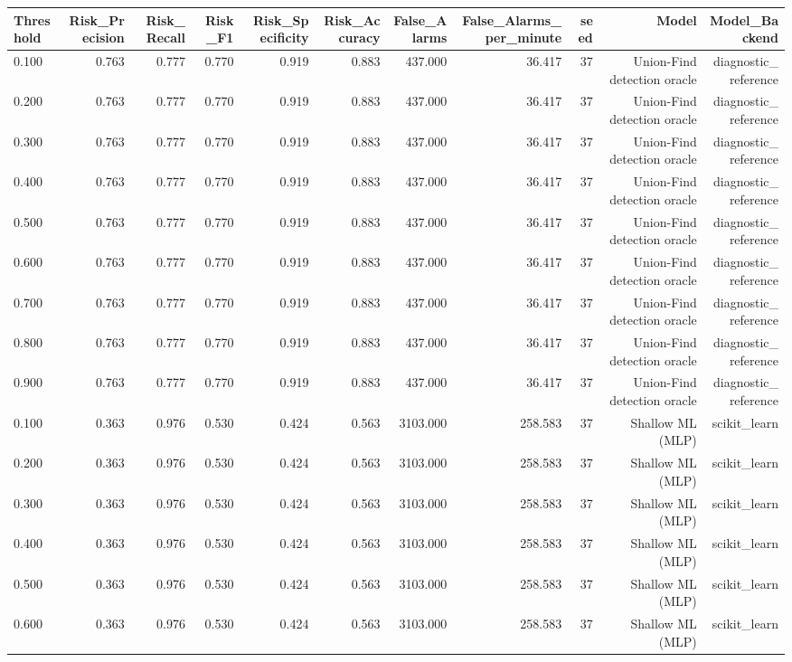 \begin{tabular}{lrrrrrrrrrr}
\toprule
Threshold & Risk\_Precision & Risk\_Recall & Risk\_F1 & Risk\_Specificity & Risk\_Accuracy & False\_Alarms & False\_Alarms\_per\_minute & seed & Model & Model\_Backend \\
\midrule
0.100 & 0.763 & 0.777 & 0.770 & 0.919 & 0.883 & 437.000 & 36.417 & 37 & Union-Find detection oracle & diagnostic\_reference \\
0.200 & 0.763 & 0.777 & 0.770 & 0.919 & 0.883 & 437.000 & 36.417 & 37 & Union-Find detection oracle & diagnostic\_reference \\
0.300 & 0.763 & 0.777 & 0.770 & 0.919 & 0.883 & 437.000 & 36.417 & 37 & Union-Find detection oracle & diagnostic\_reference \\
0.400 & 0.763 & 0.777 & 0.770 & 0.919 & 0.883 & 437.000 & 36.417 & 37 & Union-Find detection oracle & diagnostic\_reference \\
0.500 & 0.763 & 0.777 & 0.770 & 0.919 & 0.883 & 437.000 & 36.417 & 37 & Union-Find detection oracle & diagnostic\_reference \\
0.600 & 0.763 & 0.777 & 0.770 & 0.919 & 0.883 & 437.000 & 36.417 & 37 & Union-Find detection oracle & diagnostic\_reference \\
0.700 & 0.763 & 0.777 & 0.770 & 0.919 & 0.883 & 437.000 & 36.417 & 37 & Union-Find detection oracle & diagnostic\_reference \\
0.800 & 0.763 & 0.777 & 0.770 & 0.919 & 0.883 & 437.000 & 36.417 & 37 & Union-Find detection oracle & diagnostic\_reference \\
0.900 & 0.763 & 0.777 & 0.770 & 0.919 & 0.883 & 437.000 & 36.417 & 37 & Union-Find detection oracle & diagnostic\_reference \\
0.100 & 0.363 & 0.976 & 0.530 & 0.424 & 0.563 & 3103.000 & 258.583 & 37 & Shallow ML (MLP) & scikit\_learn \\
0.200 & 0.363 & 0.976 & 0.530 & 0.424 & 0.563 & 3103.000 & 258.583 & 37 & Shallow ML (MLP) & scikit\_learn \\
0.300 & 0.363 & 0.976 & 0.530 & 0.424 & 0.563 & 3103.000 & 258.583 & 37 & Shallow ML (MLP) & scikit\_learn \\
0.400 & 0.363 & 0.976 & 0.530 & 0.424 & 0.563 & 3103.000 & 258.583 & 37 & Shallow ML (MLP) & scikit\_learn \\
0.500 & 0.363 & 0.976 & 0.530 & 0.424 & 0.563 & 3103.000 & 258.583 & 37 & Shallow ML (MLP) & scikit\_learn \\
0.600 & 0.363 & 0.976 & 0.530 & 0.424 & 0.563 & 3103.000 & 258.583 & 37 & Shallow ML (MLP) & scikit\_learn \\

\end{tabular}

